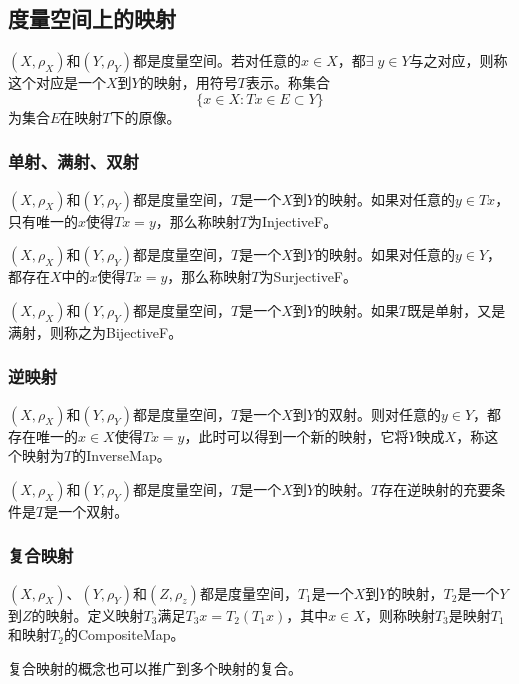 \subsection{度量空间上的映射}
\begin{definition}
	$(X,\rho_X)$和$(Y,\rho_Y)$都是度量空间。若对任意的$ x\in X$，都$\exists\;y\in Y$与之对应，则称这个对应是一个$X$到$Y$的映射，用符号$T$表示。称集合
	\begin{equation*}
		\{x\in X:Tx\in E\subset Y\}
	\end{equation*}
	为集合$E$在映射$T$下的原像。
\end{definition}
\subsubsection{单射、满射、双射}
\begin{definition}
	$(X,\rho_X)$和$(Y,\rho_Y)$都是度量空间，$T$是一个$X$到$Y$的映射。如果对任意的$y\in Tx$，只有唯一的$x$使得$Tx=y$，那么称映射$T$为\gls{InjectiveF}。
\end{definition}
\begin{definition}
	$(X,\rho_X)$和$(Y,\rho_Y)$都是度量空间，$T$是一个$X$到$Y$的映射。如果对任意的$y\in Y$，都存在$X$中的$x$使得$Tx=y$，那么称映射$T$为\gls{SurjectiveF}。
\end{definition}
\begin{definition}
	$(X,\rho_X)$和$(Y,\rho_Y)$都是度量空间，$T$是一个$X$到$Y$的映射。如果$T$既是单射，又是满射，则称之为\gls{BijectiveF}。
\end{definition}
\subsubsection{逆映射}
\begin{definition}
	$(X,\rho_X)$和$(Y,\rho_Y)$都是度量空间，$T$是一个$X$到$Y$的双射。则对任意的$y\in Y$，都存在唯一的$x\in X$使得$Tx=y$，此时可以得到一个新的映射，它将$Y$映成$X$，称这个映射为$T$的\gls{InverseMap}。
\end{definition}
\begin{theorem}
	$(X,\rho_X)$和$(Y,\rho_Y)$都是度量空间，$T$是一个$X$到$Y$的映射。$T$存在逆映射的充要条件是$T$是一个双射。
\end{theorem}
\subsubsection{复合映射}
\begin{definition}
	$(X,\rho_X)$、$(Y,\rho_Y)$和$(Z,\rho_z)$都是度量空间，$T_1$是一个$X$到$Y$的映射，$T_2$是一个$Y$到$Z$的映射。定义映射$T_3$满足$T_3x=T_2(T_1x)$，其中$x\in X$，则称映射$T_3$是映射$T_1$和映射$T_2$的\gls{CompositeMap}。
\end{definition}
复合映射的概念也可以推广到多个映射的复合。
